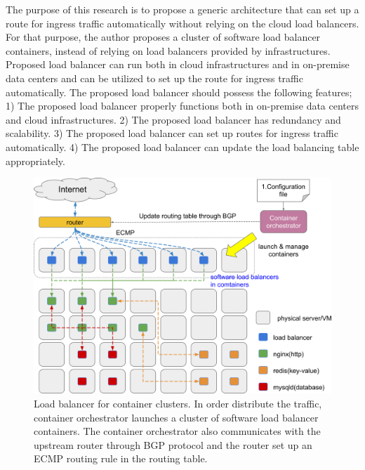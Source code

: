   The purpose of this research is to propose a generic architecture that can set up a route for ingress traffic automatically without relying on the cloud load balancers.
  For that purpose, the author proposes a cluster of software load balancer containers, instead of relying on load balancers provided by infrastructures.
  Proposed load balancer can run both in cloud infrastructures and in on-premise data centers and can be utilized to set up the route for ingress traffic automatically.
The proposed load balancer should possess the following features;
1) The proposed load balancer properly functions both in on-premise data centers and cloud infrastructures.
2) The proposed load balancer has redundancy and scalability.
3) The proposed load balancer can set up routes for ingress traffic automatically.
4) The proposed load balancer can update the load balancing table appropriately.


\begin{figure}[h]
\begin{center}
  \includegraphics[width=0.9\columnwidth]{Figs/cluster_of_container_loadbalancer}
\end{center}

\par\bigskip
\centering
\begin{minipage}{0.9\columnwidth}
  \caption[Load balancer for container clusters]{
Load balancer for container clusters.
In order distribute the traffic, container orchestrator launches a cluster of software load balancer containers. 
The container orchestrator also communicates with the upstream router through BGP protocol and the router set up an ECMP routing rule in the routing table.
  }
  \label{fig:cluster_of_container_loadbalancer}
\end{minipage}

\end{figure}

